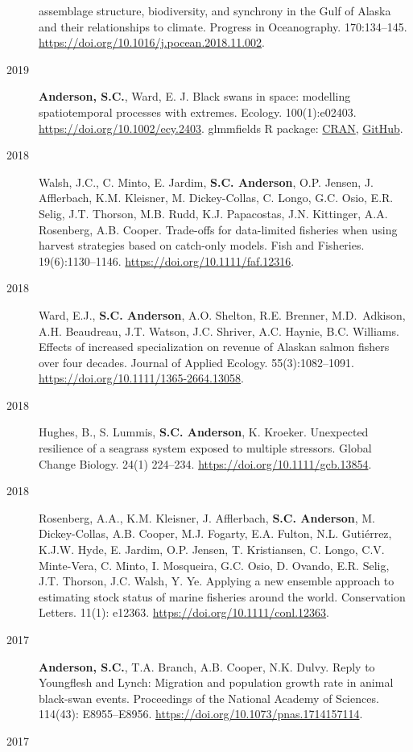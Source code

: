 \begin{description}
assemblage structure, biodiversity, and synchrony in the Gulf of Alaska
and their relationships to climate. Progress in Oceanography.
170:134--145. \url{https://doi.org/10.1016/j.pocean.2018.11.002}.
\item[2019]
\textbf{Anderson, S.C.}, Ward, E. J. Black swans in space: modelling
spatiotemporal processes with extremes. Ecology. 100(1):e02403.
\url{https://doi.org/10.1002/ecy.2403}. glmmfields R package:
\href{https://cran.r-project.org/package=glmmfields}{CRAN},
\href{https://github.com/seananderson/glmmfields}{GitHub}.
\item[2018]
Walsh, J.C., C. Minto, E. Jardim, \textbf{S.C. Anderson}, O.P. Jensen,
J. Afflerbach, K.M. Kleisner, M. Dickey-Collas, C. Longo, G.C. Osio,
E.R. Selig, J.T. Thorson, M.B. Rudd, K.J. Papacostas, J.N. Kittinger,
A.A. Rosenberg, A.B. Cooper. Trade-offs for data-limited fisheries when
using harvest strategies based on catch-only models. Fish and Fisheries.
19(6):1130--1146. \url{https://doi.org/10.1111/faf.12316}.
\item[2018]
Ward, E.J., \textbf{S.C. Anderson}, A.O. Shelton, R.E. Brenner,
M.D.\ Adkison, A.H. Beaudreau, J.T. Watson, J.C. Shriver, A.C. Haynie,
B.C. Williams. Effects of increased specialization on revenue of Alaskan
salmon fishers over four decades. Journal of Applied Ecology.
55(3):1082--1091. \url{https://doi.org/10.1111/1365-2664.13058}.
\item[2018]
Hughes, B., S. Lummis, \textbf{S.C. Anderson}, K. Kroeker. Unexpected
resilience of a seagrass system exposed to multiple stressors. Global
Change Biology. 24(1) 224--234. \url{https://doi.org/10.1111/gcb.13854}.
\item[2018]
Rosenberg, A.A., K.M. Kleisner, J. Afflerbach, \textbf{S.C. Anderson},
M. Dickey-Collas, A.B. Cooper, M.J. Fogarty, E.A. Fulton, N.L.
Gutiérrez, K.J.W. Hyde, E. Jardim, O.P. Jensen, T. Kristiansen, C.
Longo, C.V. Minte-Vera, C. Minto, I. Mosqueira, G.C. Osio, D. Ovando,
E.R. Selig, J.T. Thorson, J.C. Walsh, Y. Ye. Applying a new ensemble
approach to estimating stock status of marine fisheries around the
world. Conservation Letters. 11(1): e12363.
\url{https://doi.org/10.1111/conl.12363}.
\item[2017]
\textbf{Anderson, S.C.}, T.A. Branch, A.B. Cooper, N.K. Dulvy. Reply to
Youngflesh and Lynch: Migration and population growth rate in animal
black-swan events. Proceedings of the National Academy of Sciences.
114(43): E8955--E8956. \url{https://doi.org/10.1073/pnas.1714157114}.
\item[2017]

\end{description}
